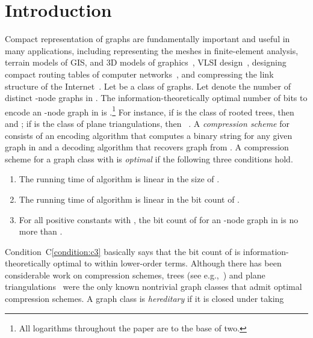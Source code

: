 \documentclass[12pt]{article}
\begin{document}
\section{Introduction}
Compact representation of graphs are fundamentally important and
useful in many applications, including representing the meshes in
finite-element analysis, terrain models of GIS, and 3D models of
graphics~\cite{Rossignac99,Rossignac-edgebreaker,RossignacSS01,TaubinR98,SnoeyinkVK97,LopesTRSS02,SzymczakKR01,IsenburgS01}, VLSI
design~\cite{SahaS09,KrivogradTZ08}, designing compact routing tables
of computer
networks~\cite{Thorup04,GavoilleH99,Lu10,Peleg00,Gavoille00,ThorupZ01,AbrahamMR09,Chechik11,AgarwalGH11,GavoilleS11},
and compressing the link structure of the
Internet~\cite{BroderKMPRSTW00,AdlerM01,SuelY01,AsanoMN09,AnhM10,ClaudeN10}.
Let  be a class of graphs.  Let  denote the
number of distinct -node graphs in .  The
information-theoretically optimal number of bits to encode an -node
graph in  is .\footnote{All
  logarithms throughout the paper are to the base of two.}  For
instance, if  is the class of rooted trees, then
 and
; if  is the class of plane
triangulations, then ~\cite{Tutte62}.
A {\em compression scheme}  for  consists of an encoding
algorithm  that computes a binary string
 for any given graph  in  and a decoding
algorithm  that recovers graph  from
.  A compression scheme  for a graph class 
with  is {\em optimal} if the following
three conditions hold.
\begin{enumerate}[\em {Condition}~C1:]
\addtolength{\itemsep}{-0.5\baselineskip}
\item 
\label{condition:c1}
The running time of algorithm  is linear in the size of
.

\item 
\label{condition:c2}
The running time of algorithm  is linear
in the bit count of .

\item 
\label{condition:c3}
For all positive constants  with , the bit count of  for an -node
graph  in  is no more than .
\end{enumerate}
Condition~C\ref{condition:c3} basically says that the bit count of
 is information-theoretically optimal to within
lower-order terms.  Although there has been considerable work on
compression schemes, trees (see
e.g.,~\cite{MunroR01,Jacobson89,LuY08,BenoitDMRRR05}) and plane
triangulations~\cite{PoulalhonS06} were the only known nontrivial
graph classes that admit optimal compression schemes.
A graph class is {\em hereditary} if it is closed under taking
\end{document}
